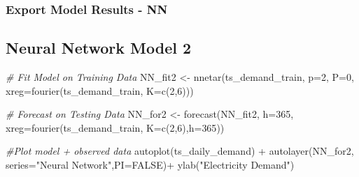 \documentclass[
]{article}
\newenvironment{Shaded}{\begin{snugshade}}{\end{snugshade}}
\newcommand{\AttributeTok}[1]{\textcolor[rgb]{0.77,0.63,0.00}{#1}}
\newcommand{\CommentTok}[1]{\textcolor[rgb]{0.56,0.35,0.01}{\textit{#1}}}
\newcommand{\ConstantTok}[1]{\textcolor[rgb]{0.00,0.00,0.00}{#1}}
\newcommand{\DecValTok}[1]{\textcolor[rgb]{0.00,0.00,0.81}{#1}}
\newcommand{\FunctionTok}[1]{\textcolor[rgb]{0.00,0.00,0.00}{#1}}
\newcommand{\NormalTok}[1]{#1}
\newcommand{\OtherTok}[1]{\textcolor[rgb]{0.56,0.35,0.01}{#1}}
\newcommand{\SpecialCharTok}[1]{\textcolor[rgb]{0.00,0.00,0.00}{#1}}
\newcommand{\StringTok}[1]{\textcolor[rgb]{0.31,0.60,0.02}{#1}}
\begin{document}
\hypertarget{export-model-results---nn}{%
\subsubsection{Export Model Results -
NN}\label{export-model-results---nn}}

\begin{Shaded}
\end{Shaded}

\hypertarget{neural-network-model-2}{%
\subsection{Neural Network Model 2}\label{neural-network-model-2}}

\begin{Shaded}
\begin{Highlighting}[]
\CommentTok{\# Fit Model on Training Data}
\NormalTok{NN\_fit2 }\OtherTok{\textless{}{-}} \FunctionTok{nnetar}\NormalTok{(ts\_demand\_train,}
                 \AttributeTok{p=}\DecValTok{2}\NormalTok{,}
                 \AttributeTok{P=}\DecValTok{0}\NormalTok{,}
                 \AttributeTok{xreg=}\FunctionTok{fourier}\NormalTok{(ts\_demand\_train, }\AttributeTok{K=}\FunctionTok{c}\NormalTok{(}\DecValTok{2}\NormalTok{,}\DecValTok{6}\NormalTok{)))}

\CommentTok{\# Forecast on Testing Data}
\NormalTok{NN\_for2 }\OtherTok{\textless{}{-}} \FunctionTok{forecast}\NormalTok{(NN\_fit2, }
                   \AttributeTok{h=}\DecValTok{365}\NormalTok{,}
                   \AttributeTok{xreg=}\FunctionTok{fourier}\NormalTok{(ts\_demand\_train, }
                                          \AttributeTok{K=}\FunctionTok{c}\NormalTok{(}\DecValTok{2}\NormalTok{,}\DecValTok{6}\NormalTok{),}\AttributeTok{h=}\DecValTok{365}\NormalTok{))}


\CommentTok{\#Plot model + observed data}
\FunctionTok{autoplot}\NormalTok{(ts\_daily\_demand) }\SpecialCharTok{+}
  \FunctionTok{autolayer}\NormalTok{(NN\_for2, }\AttributeTok{series=}\StringTok{"Neural Network"}\NormalTok{,}\AttributeTok{PI=}\ConstantTok{FALSE}\NormalTok{)}\SpecialCharTok{+}
  \FunctionTok{ylab}\NormalTok{(}\StringTok{"Electricity Demand"}\NormalTok{) }
\end{Highlighting}
\end{Shaded}
\end{document}
